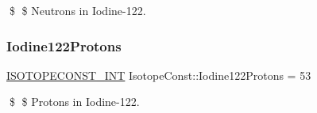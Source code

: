 \$ \$ Neutrons in Iodine-\/122. \mbox{\label{group___isotope_const-_iodine-_i122_gab79b2dc8150be38c94795eca7e38c87c}} 
\subsubsection{\texorpdfstring{Iodine122\+Protons}{Iodine122Protons}}
{\footnotesize\ttfamily \mbox{\hyperlink{group___isotope_const-_macros_ga5f18360b3e99483a35c32d789e62621c}{I\+S\+O\+T\+O\+P\+E\+C\+O\+N\+S\+T\+\_\+\+I\+NT}} Isotope\+Const\+::\+Iodine122\+Protons = 53}

\$ \$ Protons in Iodine-\/122. 